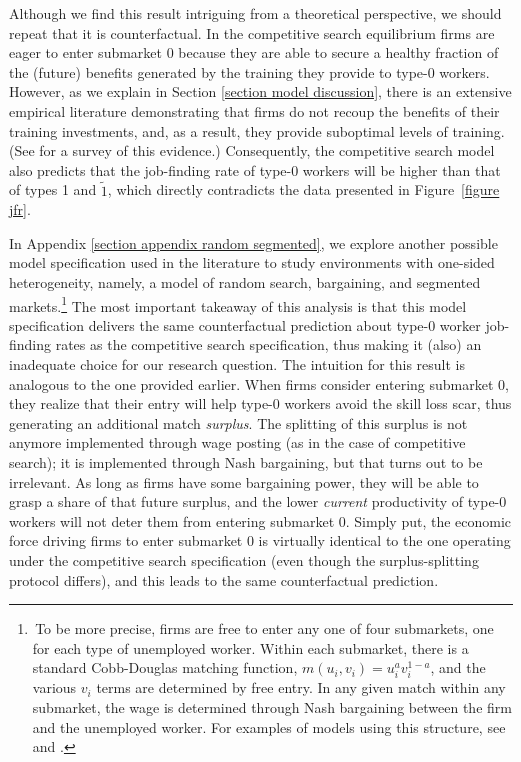 \documentclass[12pt]{article} %
\theoremstyle{definition}
\begin{document}
Although we find this result intriguing from a theoretical perspective, we should repeat that it is counterfactual. In the competitive search equilibrium firms are eager to enter submarket 0
because they are able to secure a healthy fraction of the (future) benefits generated by the training they provide to type-0 workers. However, as we explain in Section \ref{section model discussion}, there is an extensive empirical literature demonstrating that firms do not recoup the benefits of their training investments, and, as a result, they provide suboptimal levels of training. (See \citealt{pallais2014inefficient} for a survey of this evidence.) Consequently, the competitive search model also predicts that the job-finding rate of type-0 workers will be higher than that of types 1 and $\tilde{1}$, which directly contradicts the data presented in Figure~\ref{figure jfr}. 

In Appendix \ref{section appendix random segmented}, we explore another possible model specification used in the literature to study environments with one-sided heterogeneity, namely, a model of random search, bargaining, and segmented markets.\footnote{\,To be more precise, firms are free to enter any one of four submarkets, one for each type of unemployed worker. Within each submarket, there is a standard Cobb-Douglas matching function, $m(u_i,v_i)=u_i^a v_i^{1-a}$, and the various $v_i$ terms are determined by free entry. In any given match within any submarket, the wage is determined through Nash bargaining between the firm and the unemployed worker. For examples of models using this structure, see \cite{mortensen1999unemployment} and \cite{krause2006cyclical}.} The most important takeaway of this analysis is that this model specification delivers the same counterfactual prediction about type-0 worker job-finding rates as the competitive search specification, thus making it (also) an inadequate choice for our research question. The intuition for this result is analogous to the one provided earlier.
When firms consider entering submarket 0, they realize that their entry will help type-0 workers avoid the skill loss scar, thus generating an additional match \textit{surplus}. The splitting of this surplus is not anymore implemented through wage posting (as in the case of competitive search); it is implemented through Nash bargaining, but that turns out to be irrelevant. As long as firms have some bargaining power, they will be able to grasp a share  of that future surplus, and the lower \textit{current} productivity of type-0 workers will not deter them from entering submarket 0. Simply put, the economic force driving firms to enter submarket 0 is virtually identical to the one operating under the competitive search specification (even though the surplus-splitting protocol differs), and this leads to the same counterfactual prediction. 
\end{document}

